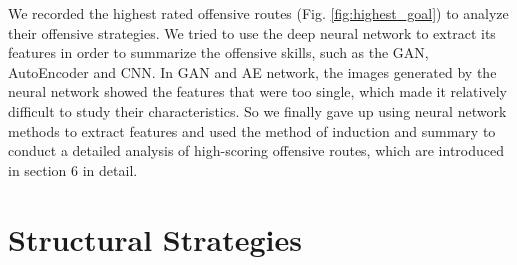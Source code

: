 \documentclass{mcmthesis}
\begin{document}
We recorded the highest rated offensive routes (Fig. \ref{fig:highest_goal}) to analyze their offensive strategies. We tried to use the deep neural network to extract its features in order to summarize the offensive skills, such as the GAN, AutoEncoder and CNN. In GAN and AE network, the images generated by the neural network showed the features that were too single, which made it relatively difficult to study their characteristics. So we finally gave up using neural network methods to extract features and used the method of induction and summary to conduct a detailed analysis of high-scoring offensive routes, which are introduced in section 6 in detail.


\section{Structural Strategies}
\end{document}
